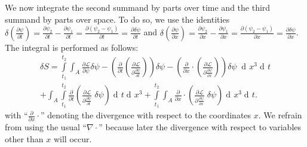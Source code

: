 \documentclass[prb,preprint]{revtex4-1}
\DeclareMathOperator{\dd}{d\!}
\begin{document}
We now integrate the second summand by parts over time and the third summand by parts over space.
To do so, we use the identities
$\delta \left(\frac{\partial \psi} {\partial t}\right)
= \frac{\partial \psi_2} {\partial t} - \frac{\partial \psi_1} {\partial t}
= \frac{\partial (\psi_2 - \psi_1)} {\partial t}
= \frac{\partial \delta \psi} {\partial t}$ 
and
$\delta \left(\frac{\partial \psi} {\partial x}\right)
= \frac{\partial \psi_2} {\partial x} - \frac{\partial \psi_1} {\partial x}
= \frac{\partial (\psi_2 - \psi_1)} {\partial x}
= \frac{\partial \delta \psi} {\partial x}$.
The integral is performed as follows:
\begin{equation} \label{calcDeltaSSection2}
\begin{split}
\delta S = \int\limits_{t_1}^{t_2} \int_{A} 
\frac{\partial \mathcal{L}}{\partial \psi} \delta \psi
-\left(\frac{\partial}{\partial t} \left( \frac{\partial \mathcal{L}}{\partial \frac{\partial \psi}{\partial t}} \right)\right) \delta \psi
-\left(\frac{\partial}{\partial x} \cdot \left( \frac{\partial \mathcal{L}}{\partial \frac{\partial \psi}{\partial x}} \right)\right) \delta \psi \;
\dd x^3 \dd t \\
+ \int_{A} \int\limits_{t_1}^{t_2} \frac{\partial}{\partial t} \left(\frac{\partial \mathcal{L}}{\partial \frac{\partial \psi}{\partial t}} \; \delta \psi \right) \dd t \dd x^3
+ \int\limits_{t_1}^{t_2} 
\int_{A} \frac{\partial}{\partial x} \cdot \left( \frac{\partial \mathcal{L}}{\partial \frac{\partial \psi}{\partial x}} \; \delta \psi \right) \dd x^3  \dd t.
\end{split}
\end{equation}
with ``$\frac{\partial}{\partial x} \cdot$'' denoting the divergence with respect to the coordinates $x$.
We refrain from using the usual ``$\nabla \cdot$'' because later the divergence with respect to variables other than $x$ will occur.
\end{document}
